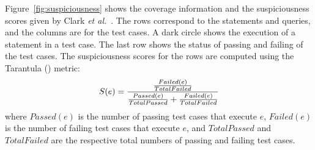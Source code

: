 
Figure~\ref{fig:suspiciousness} shows the coverage information and the
suspiciousness scores given by Clark {\em et al.}~\cite{ga-ase11}.
The rows correspond to the statements and queries, and the columns are
for the test cases. A dark circle shows the execution of a statement
in a test case. The last row shows the status of passing and failing
of the test cases. The suspiciousness scores for the rows are computed
using the Tarantula (\cite{tarantula05}) metric:
\begin{equation}
\small
\label{eq:tarantula}
    S(e) = \dfrac{\tfrac{Failed(e)}{TotalFailed}}{\tfrac{Passed(e)}{TotalPassed} + \tfrac{Failed(e)}{TotalFailed}}
\end{equation}
where $Passed(e)$ is the number of passing test cases that execute
$e$, $Failed(e)$ is the number of failing test cases that execute $e$,
and $TotalPassed$ and $TotalFailed$ are the respective total numbers
of passing and failing test cases.


